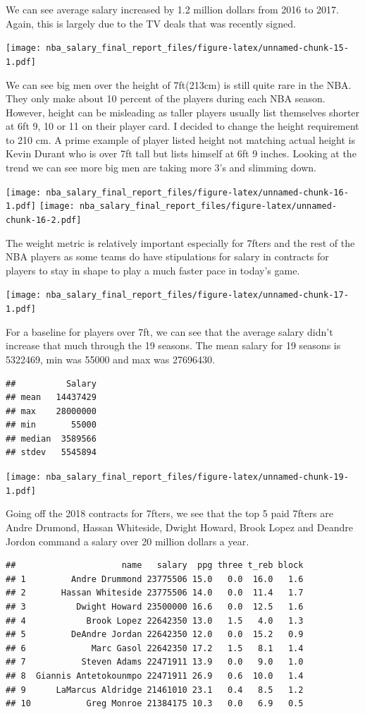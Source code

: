 \documentclass[]{article}
\begin{document}
We can see average salary increased by 1.2 million dollars from 2016 to
2017. Again, this is largely due to the TV deals that was recently
signed.

\texttt{[image: nba\_salary\_final\_report\_files/figure-latex/unnamed-chunk-15-1.pdf]}

We can see big men over the height of 7ft(213cm) is still quite rare in
the NBA. They only make about 10 percent of the players during each NBA
season. However, height can be misleading as taller players usually list
themselves shorter at 6ft 9, 10 or 11 on their player card. I decided to
change the height requirement to 210 cm. A prime example of player
listed height not matching actual height is Kevin Durant who is over 7ft
tall but lists himself at 6ft 9 inches. Looking at the trend we can see
more big men are taking more 3's and slimming down.

\texttt{[image: nba\_salary\_final\_report\_files/figure-latex/unnamed-chunk-16-1.pdf]}
\texttt{[image: nba\_salary\_final\_report\_files/figure-latex/unnamed-chunk-16-2.pdf]}

The weight metric is relatively important especially for 7fters and the
rest of the NBA players as some teams do have stipulations for salary in
contracts for players to stay in shape to play a much faster pace in
today's game.

\texttt{[image: nba\_salary\_final\_report\_files/figure-latex/unnamed-chunk-17-1.pdf]}

For a baseline for players over 7ft, we can see that the average salary
didn't increase that much through the 19 seasons. The mean salary for 19
seasons is 5322469, min was 55000 and max was 27696430.

\begin{verbatim}
##          Salary
## mean   14437429
## max    28000000
## min       55000
## median  3589566
## stdev   5545894
\end{verbatim}

\texttt{[image: nba\_salary\_final\_report\_files/figure-latex/unnamed-chunk-19-1.pdf]}

Going off the 2018 contracts for 7fters, we see that the top 5 paid
7fters are Andre Drumond, Hassan Whiteside, Dwight Howard, Brook Lopez
and Deandre Jordon command a salary over 20 million dollars a year.

\begin{verbatim}
##                     name   salary  ppg three t_reb block
## 1         Andre Drummond 23775506 15.0   0.0  16.0   1.6
## 2       Hassan Whiteside 23775506 14.0   0.0  11.4   1.7
## 3          Dwight Howard 23500000 16.6   0.0  12.5   1.6
## 4            Brook Lopez 22642350 13.0   1.5   4.0   1.3
## 5         DeAndre Jordan 22642350 12.0   0.0  15.2   0.9
## 6             Marc Gasol 22642350 17.2   1.5   8.1   1.4
## 7           Steven Adams 22471911 13.9   0.0   9.0   1.0
## 8  Giannis Antetokounmpo 22471911 26.9   0.6  10.0   1.4
## 9      LaMarcus Aldridge 21461010 23.1   0.4   8.5   1.2
## 10           Greg Monroe 21384175 10.3   0.0   6.9   0.5
\end{verbatim}
\end{document}
